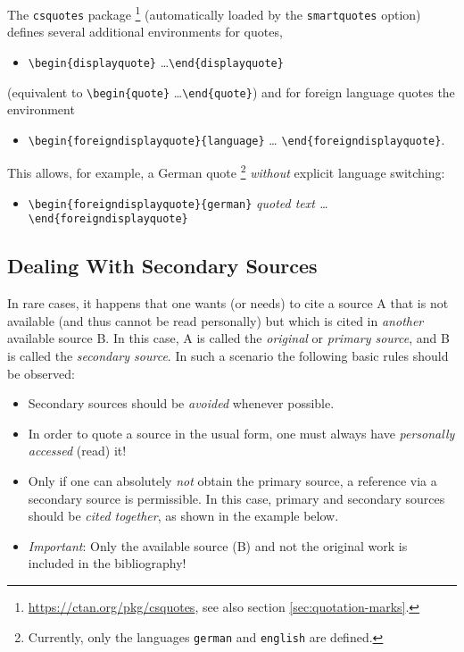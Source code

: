The \texttt{csquotes} package%
\footnote{\url{https://ctan.org/pkg/csquotes}, see also section
\ref{sec:quotation-marks}.}
(automatically loaded by the \texttt{smartquotes} option) defines several
additional environments for quotes, \eg
%
\begin{itemize}
    \item[] \verb!\begin{displayquote}! \ldots \verb!\end{displayquote}!
\end{itemize}
%
(equivalent to \verb!\begin{quote}! \ldots \verb!\end{quote}!) and for foreign
language quotes the environment
%
\begin{itemize}
    \item[] \verb!\begin{foreigndisplayquote}{language}! \ldots
    \verb!\end{foreigndisplayquote}!.
\end{itemize}
%
This allows, for example, a German quote%
\footnote{Currently, only the languages \texttt{german} and \texttt{english}
are defined.}
\emph{without} explicit language switching:
%
\begin{itemize}
    \item[] \verb!\begin{foreigndisplayquote}{german}!\newline
    \emph{quoted text \ldots}\newline
    \verb!\end{foreigndisplayquote}!
\end{itemize}

\subsection{Dealing With Secondary Sources}

In rare cases, it happens that one wants (or needs) to cite a source \textrm{A}
that is not available (and thus cannot be read personally) but which is cited in
\emph{another} available source \textrm{B}. In this case, \textrm{A} is called
the \emph{original} or \emph{primary source}, and \textrm{B} is called the
\emph{secondary source}. In such a scenario the following basic rules should be
observed:
%
\begin{itemize}
    \item Secondary sources should be \emph{avoided} whenever
    possible.
    \item In order to quote a source in the usual form, one must always have
    \emph{personally accessed} (read) it!
    \item Only if one can absolutely \emph{not} obtain the primary source, a
    reference via a secondary source is permissible. In this case, primary and
    secondary sources should be \emph{cited together}, as shown in the example
    below.
    \item \emph{Important}: Only the available source (\textrm{B}) and not
    the original work is included in the bibliography!
\end{itemize}
%
